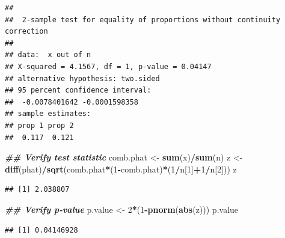 \documentclass[
]{book}
\newenvironment{Shaded}{\begin{snugshade}}{\end{snugshade}}
\newcommand{\DecValTok}[1]{\textcolor[rgb]{0.00,0.00,0.81}{#1}}
\newcommand{\DocumentationTok}[1]{\textcolor[rgb]{0.56,0.35,0.01}{\textbf{\textit{#1}}}}
\newcommand{\FunctionTok}[1]{\textcolor[rgb]{0.13,0.29,0.53}{\textbf{#1}}}
\newcommand{\NormalTok}[1]{#1}
\newcommand{\OtherTok}[1]{\textcolor[rgb]{0.56,0.35,0.01}{#1}}
\newcommand{\SpecialCharTok}[1]{\textcolor[rgb]{0.81,0.36,0.00}{\textbf{#1}}}
\theoremstyle{definition}
\theoremstyle{definition}
\theoremstyle{definition}
\theoremstyle{definition}
\theoremstyle{remark}
\begin{document}
\begin{verbatim}
## 
##  2-sample test for equality of proportions without continuity correction
## 
## data:  x out of n
## X-squared = 4.1567, df = 1, p-value = 0.04147
## alternative hypothesis: two.sided
## 95 percent confidence interval:
##  -0.0078401642 -0.0001598358
## sample estimates:
## prop 1 prop 2 
##  0.117  0.121
\end{verbatim}

\begin{Shaded}
\begin{Highlighting}[]
\DocumentationTok{\#\# Verify test statistic}
\NormalTok{comb.phat }\OtherTok{\textless{}{-}} \FunctionTok{sum}\NormalTok{(x)}\SpecialCharTok{/}\FunctionTok{sum}\NormalTok{(n)}
\NormalTok{z }\OtherTok{\textless{}{-}} \FunctionTok{diff}\NormalTok{(phat)}\SpecialCharTok{/}\FunctionTok{sqrt}\NormalTok{(comb.phat}\SpecialCharTok{*}\NormalTok{(}\DecValTok{1}\SpecialCharTok{{-}}\NormalTok{comb.phat)}\SpecialCharTok{*}\NormalTok{(}\DecValTok{1}\SpecialCharTok{/}\NormalTok{n[}\DecValTok{1}\NormalTok{]}\SpecialCharTok{+}\DecValTok{1}\SpecialCharTok{/}\NormalTok{n[}\DecValTok{2}\NormalTok{]))}
\NormalTok{z}
\end{Highlighting}
\end{Shaded}

\begin{verbatim}
## [1] 2.038807
\end{verbatim}

\begin{Shaded}
\begin{Highlighting}[]
\DocumentationTok{\#\# Verify p{-}value}
\NormalTok{p.value }\OtherTok{\textless{}{-}} \DecValTok{2}\SpecialCharTok{*}\NormalTok{(}\DecValTok{1}\SpecialCharTok{{-}}\FunctionTok{pnorm}\NormalTok{(}\FunctionTok{abs}\NormalTok{(z))) }
\NormalTok{p.value}
\end{Highlighting}
\end{Shaded}

\begin{verbatim}
## [1] 0.04146928
\end{verbatim}

\begin{Shaded}
\end{Shaded}
\end{document}
